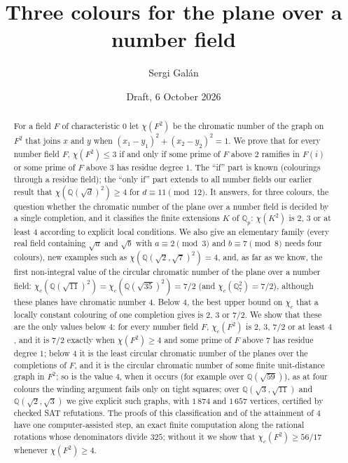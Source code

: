 \documentclass[11pt,a4paper]{amsart}
\title{Three colours for the plane over a number field}
\author{Sergi Gal\'an}
\date{Draft, 6 October 2026}
\theoremstyle{remark}
\newcommand{\Q}{\mathbb{Q}}
\begin{document}
\begin{abstract}
For a field $F$ of characteristic $0$ let $\chi(F^2)$ be the chromatic number of the graph on $F^2$ that joins $x$
and $y$ when $(x_1-y_1)^2+(x_2-y_2)^2=1$. We prove that for every number field $F$, $\chi(F^2)\le3$ if and only if
some prime of $F$ above $2$ ramifies in $F(i)$ or some prime of $F$ above $3$ has residue degree $1$. The ``if'' part
is known (colourings through a residue field); the ``only if'' part extends to all number fields our earlier
result that $\chi(\Q(\sqrt d)^2)\ge4$ for $d\equiv11\pmod{12}$. It answers, for three colours, the question whether
the chromatic number of the plane over a number field is decided by a single completion, and it classifies the
finite extensions $K$ of $\Q_p$: $\chi(K^2)$ is $2$, $3$ or at least $4$ according to explicit local conditions. We
also give an elementary family (every real field containing $\sqrt a$ and $\sqrt b$ with $a\equiv2\pmod 3$ and
$b\equiv7\pmod8$ needs four colours), new examples such as $\chi(\Q(\sqrt2,\sqrt7)^2)=4$, and, as far as we know,
the first non-integral value of the circular chromatic number of the plane over a number field:
$\chi_c(\Q(\sqrt{11})^2)=\chi_c(\Q(\sqrt{35})^2)=7/2$ (and $\chi_c(\Q_7^2)=7/2$), although these planes have chromatic
number $4$. Below $4$, the best upper bound on $\chi_c$ that a locally constant colouring of one completion gives is
$2$, $3$ or $7/2$. We show that these are the only values below $4$: for every number field $F$, $\chi_c(F^2)$ is $2$, $3$,
$7/2$ or at least $4$, and it is $7/2$ exactly when $\chi(F^2)\ge4$ and some prime of $F$ above $7$ has residue
degree $1$; below $4$ it is the least circular chromatic number of the planes over the completions of $F$, and it is
the circular chromatic number of some finite unit-distance graph in $F^2$; so is the value $4$, when it occurs (for
example over $\Q(\sqrt{59})$), as at four colours the winding argument fails only on tight squares; over
$\Q(\sqrt3,\sqrt{11})$ and $\Q(\sqrt2,\sqrt3)$ we give explicit such graphs, with $1\,874$ and $1\,657$ vertices,
certified by checked SAT refutations. The proofs of this classification and of the attainment of $4$ have one
computer-assisted step, an exact finite computation along the rational rotations whose denominators divide $325$;
without it we show that $\chi_c(F^2)\ge56/17$ whenever $\chi(F^2)\ge4$.
\end{abstract}

\maketitle
\end{document}
